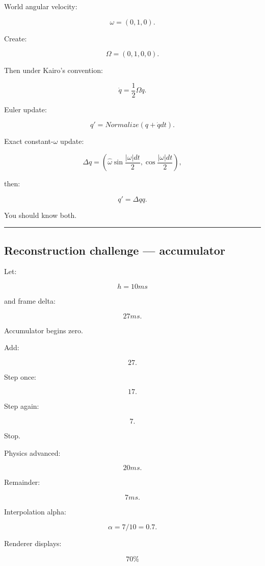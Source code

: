 World angular velocity:

\[
\omega=(0,1,0).
\]

Create:

\[
\Omega=(0,1,0,0).
\]

Then under Kairo's convention:

\[
\boxed{
\dot q
=
\frac12\Omega q.
}
\]

Euler update:

\[
q'
=
Normalize(
q+\dot qdt
).
\]

Exact constant-\(\omega\) update:

\[
\Delta q
=
\left(
\hat\omega
\sin\frac{|\omega|dt}{2},
\cos\frac{|\omega|dt}{2}
\right),
\]

then:

\[
q'
=
\Delta q q.
\]

You should know both.

\begin{center}\rule{0.5\linewidth}{0.5pt}\end{center}

\subsection{Reconstruction challenge --- accumulator}\label{06-engine-ii-ch038-reconstruction-challenge-accumulator}

\hypertarget{06-engine-ii-ch038-reconstruction-challenge-accumulator}{}

Let:

\[
h=10ms
\]

and frame delta:

\[
27ms.
\]

Accumulator begins zero.

Add:

\[
27.
\]

Step once:

\[
17.
\]

Step again:

\[
7.
\]

Stop.

Physics advanced:

\[
20ms.
\]

Remainder:

\[
7ms.
\]

Interpolation alpha:

\[
\alpha
=
7/10
=
0.7.
\]

Renderer displays:

\[
70\%
\]

